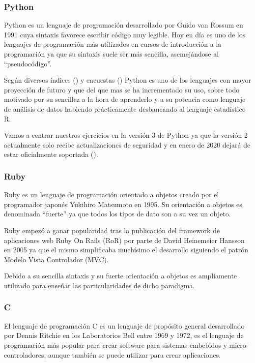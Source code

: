\subsubsection{Python}

Python es un lenguaje de programación desarrollado por Guido van Rossum en 1991 cuya sintaxis favorece escribir código muy legible. Hoy en día es uno de los lenguajes de programación más utilizados en cursos de introducción a la programación ya que su sintaxis suele ser más sencilla, asemejándose al ``pseudocódigo''.

Según diversos índices (\cite{TIOBE2019}) y encuestas (\cite{stack_overflow_stack_2019}) Python es uno de los lenguajes con mayor proyección de futuro y que del que mas se ha incrementado su uso, sobre todo motivado por su sencillez a la hora de aprenderlo y a su potencia como lenguaje de análisis de datos habiendo prácticamente desbancando al lenguaje estadístico R.

\bigskip
Vamos a centrar nuestros ejercicios en la versión 3 de Python ya que la versión 2 actualmente solo recibe actualizaciones de seguridad y en enero de 2020 dejará de estar oficialmente soportada (\cite{python.org_pep_2018}).

\subsubsection{Ruby}

Ruby es un lenguaje de programación orientado a objetos creado por el programador japonés Yukihiro Matsumoto en 1995. Su orientación a objetos es denominada ``fuerte'' ya que todos los tipos de dato son a su vez un objeto.

\bigskip
Ruby empezó a ganar popularidad tras la publicación del framework de aplicaciones web Ruby On Rails (RoR) por parte de David Heinemeier Hansson en 2005 ya que el mismo simplificaba muchísimo el desarrollo siguiendo el patrón Modelo Vista Controlador (MVC).

\bigskip
Debido a su sencilla sintaxis y su fuerte orientación a objetos es ampliamente utilizado para enseñar las particularidades de dicho paradigma.

\subsubsection{C}

El lenguaje de programación C es un lenguaje de propósito general desarrollado por Dennis Ritchie en los Laboratorios Bell entre 1969 y 1972, es el lenguaje de programación más popular para crear software para sistemas embebidos y micro-controladores, aunque también se puede utilizar para crear aplicaciones.

